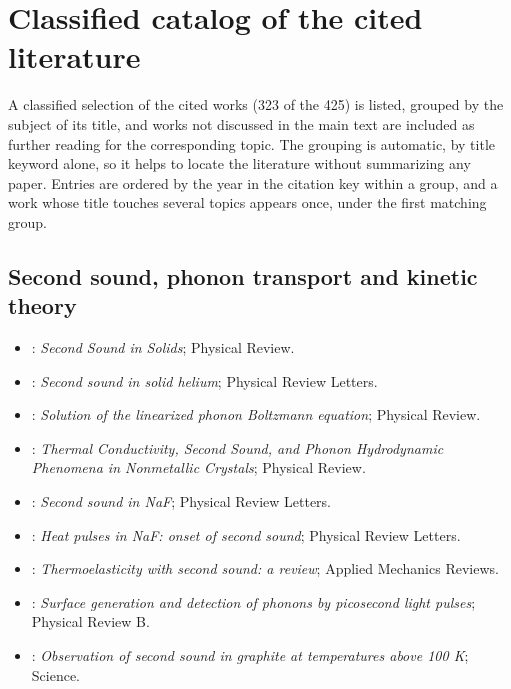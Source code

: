 \section{Classified catalog of the cited literature}\label{app:catalogue}
A classified selection of the cited works (323 of the 425) is listed, grouped by the subject of its title, and works not discussed in the main text are included as further reading for the corresponding topic. The grouping is automatic, by title keyword alone, so it helps to locate the literature without summarizing any paper. Entries are ordered by the year in the citation key within a group, and a work whose title touches several topics appears once, under the first matching group.
\subsection{Second sound, phonon transport and kinetic theory}
\begin{itemize}\itemsep0pt\small
\item \citet{Chester1963}: \emph{Second Sound in Solids}; Physical Review.
\item \citet{Ackerman1966}: \emph{Second sound in solid helium}; Physical Review Letters.
\item \citet{GuyerKrumhansl1966}: \emph{Solution of the linearized phonon Boltzmann equation}; Physical Review.
\item \citet{GuyerKrumhansl1966II}: \emph{Thermal Conductivity, Second Sound, and Phonon Hydrodynamic Phenomena in Nonmetallic Crystals}; Physical Review.
\item \citet{Jackson1970}: \emph{Second sound in NaF}; Physical Review Letters.
\item \citet{McNelly1970}: \emph{Heat pulses in NaF: onset of second sound}; Physical Review Letters.
\item \citet{Chandrasekharaiah1986}: \emph{Thermoelasticity with second sound: a review}; Applied Mechanics Reviews.
\item \citet{Thomsen1986}: \emph{Surface generation and detection of phonons by picosecond light pulses}; Physical Review B.
\item \citet{Huberman2019}: \emph{Observation of second sound in graphite at temperatures above 100 K}; Science.
\end{itemize}
